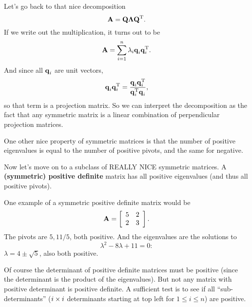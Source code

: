 Let's go back to that nice decomposition
\[ \boldsymbol{\mathbf{A}} = \boldsymbol{\mathbf{Q}}\boldsymbol{\mathbf{\Lambda}}\boldsymbol{\mathbf{Q}}^\mathrm{T}. \]
If we write out the multiplication, it turns out to be
\[ \boldsymbol{\mathbf{A}} = \sum_{i=1}^n \lambda_i \boldsymbol{\mathbf{q}}_i\boldsymbol{\mathbf{q}}_i^\mathrm{T}. \]
And since all $\boldsymbol{\mathbf{q}}_i$ are unit vectors, 
\[ \boldsymbol{\mathbf{q}}_i\boldsymbol{\mathbf{q}}_i^\mathrm{T} = \frac{\boldsymbol{\mathbf{q}}_i\boldsymbol{\mathbf{q}}_i^\mathrm{T}}{\boldsymbol{\mathbf{q}}_i^\mathrm{T}\boldsymbol{\mathbf{q}}_i}, \]
so that term is a projection matrix. So we can interpret the decomposition as the fact that any symmetric matrix is a linear combination of perpendicular projection matrices.

\brm
One other nice property of symmetric matrices is that the number of positive eigenvalues is equal to the number of positive pivots, and the same for negative.
\erm

Now let's move on to a subclass of REALLY NICE symmetric matrices.
\bdf
A \textbf{(symmetric) positive definite} matrix has all positive eigenvalues (and thus all positive pivots).
\edf

\bex
One example of a symmetric positive definite matrix would be
\[ \boldsymbol{\mathbf{A}} = \left[ \begin{array}{rrrrrrrrrrrrrrrrrrrrrrrrr} 5&2\\2&3\\ \end{array} \right]. \]
The pivots are $5, 11/5$, both positive. And the eigenvalues are the solutions to 
\[ \lambda^2 - 8\lambda + 11 = 0: \]
$\lambda = 4 \pm \sqrt 5$, also both positive.
\eex

Of course the determinant of positive definite matrices must be positive (since the determinant is the product of the eigenvalues). But not any matrix with positive determinant is positive definite. A sufficient test is to see if all ``sub-determinants'' ($i \times i$ determinants starting at top left for $1 \le i \le n$) are positive. 
